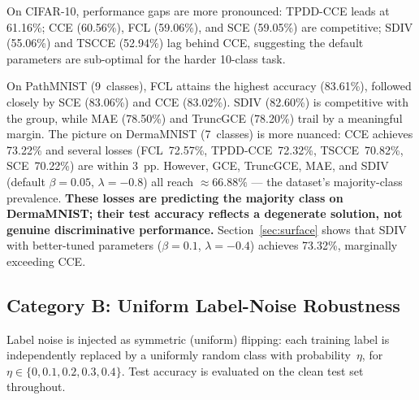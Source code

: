On CIFAR-10, performance gaps are more pronounced:
TPDD-CCE leads at 61.16\%; CCE (60.56\%), FCL (59.06\%), and SCE (59.05\%)
are competitive; SDIV (55.06\%) and TSCCE (52.94\%) lag behind CCE,
suggesting the default parameters are sub-optimal for the harder 10-class task.

On PathMNIST (9~classes), FCL attains the highest accuracy (83.61\%),
followed closely by SCE (83.06\%) and CCE (83.02\%).
SDIV (82.60\%) is competitive with the group, while MAE (78.50\%) and
TruncGCE (78.20\%) trail by a meaningful margin.
The picture on DermaMNIST (7~classes) is more nuanced:
CCE achieves 73.22\% and several losses
(FCL~72.57\%, TPDD-CCE~72.32\%, TSCCE~70.82\%, SCE~70.22\%)
are within 3~pp.
However, GCE, TruncGCE, MAE, and SDIV (default $\beta{=}0.05$,
$\lambda{=}{-0.8}$) all reach $\approx66.88\%$ --- the dataset's majority-class
prevalence.
\textbf{These losses are predicting the majority class on DermaMNIST;
their test accuracy reflects a degenerate solution, not genuine discriminative
performance.}
Section~\ref{sec:surface} shows that SDIV with better-tuned parameters
($\beta{=}0.1$, $\lambda{=}{-0.4}$) achieves 73.32\%, marginally exceeding CCE.

\subsection{Category B: Uniform Label-Noise Robustness}
\label{sec:noise}

Label noise is injected as symmetric (uniform) flipping: each training label
is independently replaced by a uniformly random class with probability~$\eta$,
for $\eta \in \{0, 0.1, 0.2, 0.3, 0.4\}$.
Test accuracy is evaluated on the clean test set throughout.

